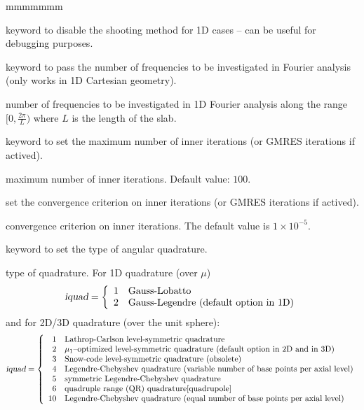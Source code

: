 \begin{ListeDeDescription}{mmmmmmm}
\item[\moc{NSHT}] keyword to disable the shooting method for 1D cases -- can be useful for debugging purposes.

\item[\moc{FOUR}] keyword to pass the number of frequencies to be investigated in Fourier analysis (only works in 1D Cartesian geometry).
\item[\dusa{nfou}] number of frequencies to be investigated in 1D Fourier analysis along the range $[0, \frac{2\pi}{L})$ where $L$ is the length of the slab.

\item[\moc{MAXI}] keyword to set the maximum number of inner iterations (or GMRES iterations if actived).
\item[\dusa{maxi}] maximum number of inner iterations. Default value: $100$.

\item[\moc{EPSI}] set the convergence criterion on inner iterations (or GMRES iterations if actived).
\item[\dusa{epsi}] convergence criterion on inner iterations. The default value is $1\times 10^{-5}$.
\item[\moc{QUAD}] keyword to set the type of angular quadrature.

\item[\dusa{iquad}] type of quadrature. For 1D quadrature (over $\mu$)
\begin{displaymath}
    \dusa{iquad} = \left\{
    \begin{array}{rl}
        1 & \textrm{Gauss-Lobatto} \\
        2 & \textrm{Gauss-Legendre (default option in 1D)} \\
    \end{array} \right.
\end{displaymath}
and for 2D/3D quadrature (over the unit sphere):
\begin{displaymath}
    \dusa{iquad} = \left\{
    \begin{array}{rl}
        1 & \textrm{Lathrop-Carlson level-symmetric quadrature} \\
        2 & \textrm{$\mu_1$--optimi\-zed level-symmetric quadrature (default option in 2D and in 3D)} \\
        3 & \textrm{Snow-code level-symmetric quadrature (obsolete)} \\
        4 & \textrm{Legendre-Chebyshev quadrature (variable number of base points per axial level)} \\
        5 & \textrm{symmetric Legendre-Chebyshev quadrature} \\
        6 & \textrm{quadruple range (QR) quadrature\cite{quadrupole}} \\
        10 & \textrm{Legendre-Chebyshev quadrature (equal number of base points per axial level)} \\
    \end{array} \right.
\end{displaymath}


\end{ListeDeDescription}
